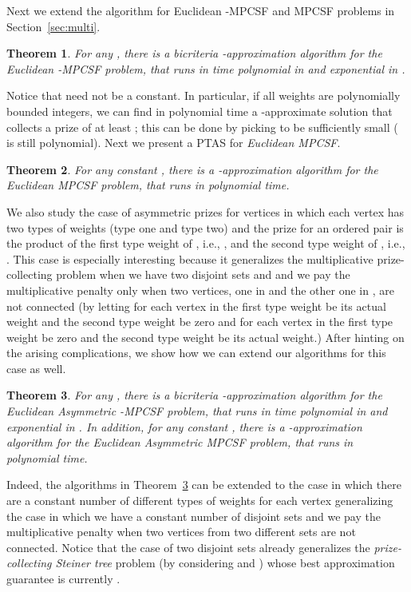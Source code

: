 \documentclass[extras,11pt]{article} \usepackage{fullpage}
\theoremstyle{mytheorem}
\newtheorem{theorem}{Theorem}
\newcommand{\prob}[1]{\textit{#1}}
\begin{document}
Next we extend the algorithm for Euclidean -MPCSF and MPCSF
problems in Section~\ref{sec:multi}.
\begin{theorem}\label{thm:smpcsf}
 For any , there is a bicriteria -approximation algorithm
 for the \prob{Euclidean -MPCSF} problem,
  that runs in time polynomial
 in  and exponential in .
\end{theorem}
Notice that  need not be a constant.
In particular, if all weights are polynomially bounded integers,
we can find in polynomial time a -approximate solution
that collects a prize of at least ; this can be done by picking
 to be sufficiently small ( is still polynomial).
Next we present a PTAS for \prob{Euclidean MPCSF}.
\begin{theorem}\label{thm:mpcsf}
 For any constant , there is a -approximation algorithm
 for the \prob{Euclidean MPCSF} problem,
  that runs in  polynomial time.
\end{theorem}



We also study the case of asymmetric prizes for vertices in which
each vertex  has two types of weights (type one and type two) and the
prize for an ordered pair  is the product of the first type
weight of , i.e., , and the second type weight of , i.e., .
This case is especially interesting because it generalizes the multiplicative
prize-collecting problem when we have two disjoint sets  and
 and we pay the multiplicative penalty only when two vertices,
one in  and the other one in , are not connected (by
letting for each vertex in  the first type weight be its actual
weight and the second type weight be zero and for each vertex in 
the first type weight be zero and the second type weight be its actual
weight.) After hinting on the arising complications, we show how we
can extend our algorithms for this case as well.

\begin{theorem}\label{thm:asym-smpcsf}
 For any , there is a bicriteria -approximation algorithm
 for the \prob{Euclidean Asymmetric -MPCSF} problem,
  that runs in time polynomial
 in  and exponential in . In addition, for any constant , there is a -approximation algorithm
 for the \prob{Euclidean Asymmetric MPCSF} problem,
  that runs in  polynomial time.
\end{theorem}

Indeed, the algorithms in Theorem~\ref{thm:asym-smpcsf} can be
extended to the case in which there are a constant number of
different types of weights for each vertex generalizing the case in
which we have a constant number of disjoint sets and we pay the
multiplicative penalty when two vertices from two different sets are
not connected.
Notice that the case of two disjoint sets already generalizes
the \prob{prize-collecting Steiner tree} problem (by considering  and )
whose best approximation
guarantee is currently .  
\end{document}
